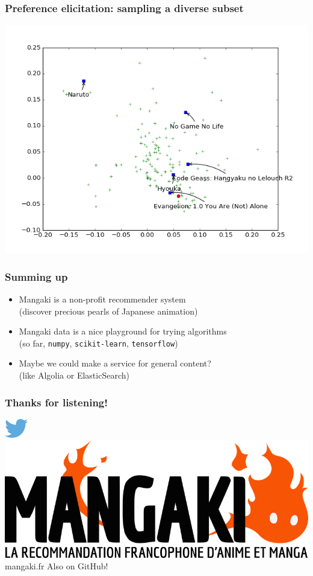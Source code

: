 \documentclass[]{beamer}
\begin{document}
\begin{frame}
  \frametitle{Preference elicitation: sampling a diverse subset}
  \includegraphics[width=\linewidth]{figures/1.png}
\end{frame}

\begin{frame}
  \frametitle{Summing up}
  \begin{itemize}
    \item Mangaki is a \alert{non-profit} recommender system\\
    \hfill (discover precious pearls of Japanese animation)\\[1cm]
    \item Mangaki data is a \alert{nice playground for trying algorithms}\\
    \hfill (so far, \texttt{numpy}, \texttt{scikit-learn}, \texttt{tensorflow})\\[1cm]
    \item Maybe we could make a service for general content?\\
    \hfill (like Algolia or ElasticSearch)
  \end{itemize}
  \centering
\end{frame}

\begin{frame}
	\frametitle{Thanks for listening!}
  \centering
  \LARGE
	\includegraphics[width=1cm]{figures/twitter.png}\,\,
  \vspace{5mm}
  \includegraphics[width=\linewidth]{figures/mangaki.png}\\
  mangaki.fr \hfill Also on GitHub!
\end{frame}
\end{document}

